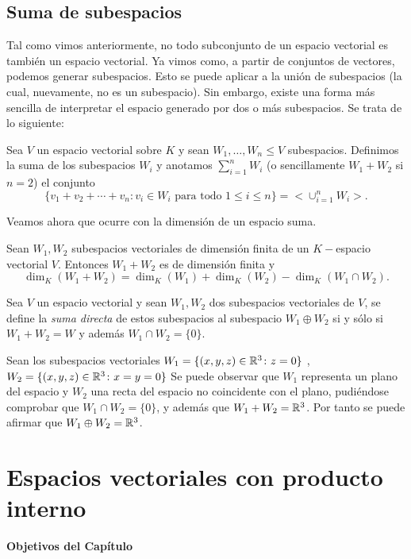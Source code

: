 \subsection{Suma de subespacios}
Tal como vimos anteriormente, no todo subconjunto de un espacio vectorial es también un espacio vectorial. Ya vimos como, a partir de conjuntos de vectores, podemos generar subespacios.
Esto se puede aplicar a la uni\'on de subespacios (la cual, nuevamente, no es un
subespacio). Sin embargo, existe una forma más sencilla de interpretar el espacio generado por dos o más subespacios. Se trata de lo siguiente:

\begin{defin}
Sea $V$ un espacio vectorial sobre $K$ y sean $W_1, \dots, W_n \leq V$ subespacios. Definimos la suma de los subespacios $W_i$ y anotamos $\sum^n_
{i=1} W_i$ (o sencillamente $W_1 + W_2$ si $n = 2$) el conjunto
\[\{v_1+v_2+\cdots+v_n \colon v_i\in W_i \text{ para todo } 1\leq i\leq n\}=<\cup_{i=1}^nW_i>.\]
\end{defin}
Veamos ahora que ocurre con la dimensi\'on de un espacio suma.
\begin{thm}
Sean $W_1, W_2$ subespacios vectoriales de dimensi\'on finita de un
$K-$espacio vectorial $V $. Entonces $W_1 + W_2$ es de dimensi\'on finita y
\[\dim_K(W_1+ W_2)=\dim_K(W_1)+\dim_K(W_2)-\dim_K(W_1\cap W_2).\]
\end{thm}



\begin{defin}
Sea $V$ un espacio vectorial y sean $W_1, W_2$ dos subespacios vectoriales de $V$, se define la
\emph{suma directa} de estos subespacios al subespacio $W_1 \oplus W_2$ si y sólo si $ W_1 + W_2= W$ y además $W_1 \cap W_2 = \{ 0\}$.
\end{defin}
\begin{ejem}
Sean los subespacios vectoriales $W_1= \{ (x, y, z) \in \mathbb{R}^3 \colon z = 0\}$ , $W_2 =\{ (x, y, z) \in \mathbb{R}^3 \colon  x = y = 0 \}$
Se puede observar que $W_1$ representa un plano del espacio y $W_2$ una recta del espacio no coincidente con el plano, pudiéndose comprobar que $W_1 \cap W_2 = \{0\}$, y además que $W_1 + W_2 = \mathbb{R}^3$. Por tanto se puede afirmar que $W_1 \oplus W_2 = \mathbb{R}^3$.
\end{ejem}
\section{Espacios vectoriales con producto interno}

\textbf{Objetivos del Capítulo}

